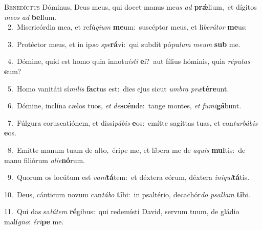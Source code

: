 \lettrine{\initial\textcolor{\initialcolor}{B}}{enedíctus} Dóminus, Deus meus, qui docet manus me\textit{as} \textit{ad} \textbf{prǽ}\-lium,~\star et dígitos \textit{me}\-\textit{os} \textit{ad} \textbf{bel}\-lum.\\
{\numbfont\textcolor{\numbcolor}{~2.}}~Misericórdia mea, et refú\-\textit{gi}\-\textit{um} \textbf{me}\-um:~\star suscéptor meus, et li\-\textit{be}\-\textit{rá}\textit{tor} \textbf{me}\-us:\par
{\numbfont\textcolor{\numbcolor}{~3.}}~Protéctor meus, et in ip\textit{so} \textit{spe}\-\textbf{rá}vi:~\star qui subdit pópu\textit{lum} \textit{me}\-\textit{um} \textbf{sub} me.\par
{\numbfont\textcolor{\numbcolor}{~4.}}~Dómine, quid est homo quia innotu\-\textit{ís}\-\textit{ti} \textbf{e}\-i?~\star aut fílius hóminis, quia \textit{ré}\-\textit{pu}\textit{tas} \textbf{e}\-um?\par
{\numbfont\textcolor{\numbcolor}{~5.}}~Homo vanitáti sí\-\textit{mi}\-\textit{lis} \textbf{fac}\-tus est:~\star dies ejus sicut \textit{um}\-\textit{bra} \textit{præ}\-\textbf{tér}\textbf{e}unt.\par
{\numbfont\textcolor{\numbcolor}{~6.}}~Dómine, inclína cælos tuos, \textit{et} \textit{de}\-\textbf{scén}de:~\star tange montes, \textit{et} \textit{fu}\-\textit{mi}\textbf{gá}bunt.\par
{\numbfont\textcolor{\numbcolor}{~7.}}~Fúlgura coruscatiónem, et dissi\-\textit{pá}\-\textit{bis} \textbf{e}\-os:~\star emítte sagíttas tuas, et con\-\textit{tur}\-\textit{bá}\textit{bis} \textbf{e}\-os.\par
{\numbfont\textcolor{\numbcolor}{~8.}}~Emítte manum tuam de alto,~\dagger éripe me, et líbera me de \textit{a}\-\textit{quis} \textbf{mul}\-tis:~\star de manu filiórum \textit{a}\-\textit{li}\textit{e}\textbf{nó}rum.\par
{\numbfont\textcolor{\numbcolor}{~9.}}~Quorum os locútum est \textit{va}\-\textit{ni}\textbf{tá}tem:~\star et déxtera eórum, déxtera \textit{in}\-\textit{i}\textit{qui}\textbf{tá}tis.\par
{\numbfont\textcolor{\numbcolor}{10.}}~Deus, cánticum novum can\-\textit{tá}\-\textit{bo} \textbf{ti}\-bi:~\star in psaltério, decachór\textit{do} \textit{psal}\-\textit{lam} \textbf{ti}\-bi.\par
{\numbfont\textcolor{\numbcolor}{11.}}~Qui das sa\-\textit{lú}\-\textit{tem} \textbf{ré}\-gibus:~\star qui redemísti David, servum tuum, de gládio malí\-\textit{gno}\-: \textit{é}\-\textit{ri}\textbf{pe} me.\par
